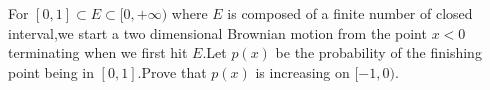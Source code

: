 For $[0,1]\subset E\subset [0,+\infty)$ where $E$ is composed of a finite number of closed interval,we start a two dimensional Brownian motion from the point $x<0$ terminating when we first hit $E$.Let $p(x)$ be the probability of the finishing point being in $[0,1]$.Prove that $p(x)$ is increasing on $[-1,0)$.
